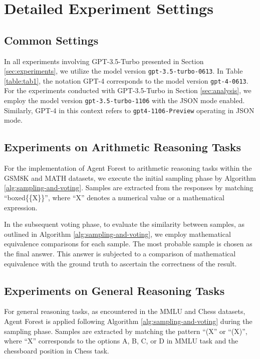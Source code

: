 \appendix
\onecolumn

\section{Detailed Experiment Settings}
\label{appendix:settings}
\subsection{Common Settings}
In all experiments involving GPT-3.5-Turbo presented in Section \ref{sec:experiments}, we utilize the model version \texttt{gpt-3.5-turbo-0613}. In Table \ref{table:tab1}, the notation GPT-4 corresponds to the model version \texttt{gpt-4-0613}. For the experiments conducted with GPT-3.5-Turbo in Section \ref{sec:analysis}, we employ the model version \texttt{gpt-3.5-turbo-1106} with the JSON mode enabled. Similarly, GPT-4 in this context refers to \texttt{gpt4-1106-Preview} operating in JSON mode.

\subsection{Experiments on Arithmetic Reasoning Tasks}
For the implementation of Agent Forest to arithmetic reasoning tasks within the GSM8K and MATH datasets, we execute the initial sampling phase by Algorithm \ref{alg:sampling-and-voting}. Samples are extracted from the responses by matching ``boxed\{\{X\}\}'', where ``X'' denotes a numerical value or a mathematical expression. 

In the subsequent voting phase, to evaluate the similarity between samples, as outlined in Algorithm \ref{alg:sampling-and-voting}, we employ mathematical equivalence comparisons for each sample. The most probable sample is chosen as the final answer. This answer is subjected to a comparison of mathematical equivalence with the ground truth to ascertain the correctness of the result.

\subsection{Experiments on General Reasoning Tasks}
For general reasoning tasks, as encountered in the MMLU and Chess datasets, Agent Forest is applied following Algorithm \ref{alg:sampling-and-voting} during the sampling phase. Samples are extracted by matching the pattern ``(X'' or ``(X)'', where ``X'' corresponds to the options A, B, C, or D in MMLU task and the chessboard position in Chess task.

